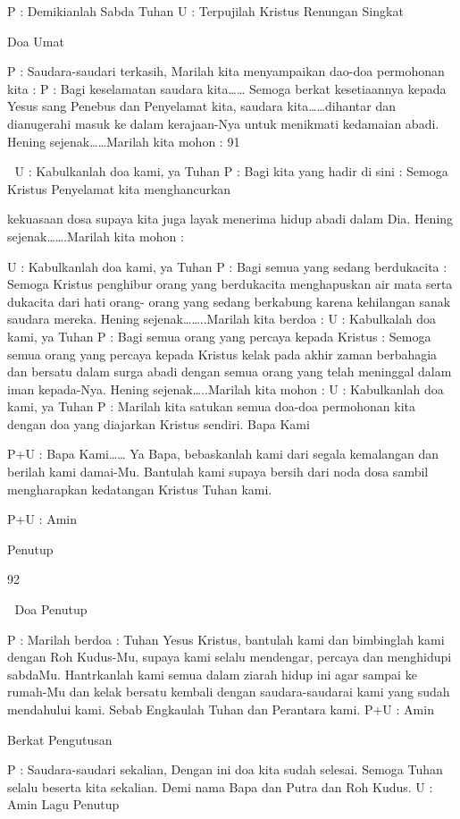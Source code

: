 \documentclass[10pt,a5paper,fancyhdr]{memoir}
\begin{document}
P : Demikianlah Sabda Tuhan 
U : Terpujilah Kristus 
Renungan Singkat 

Doa Umat 

P 
: Saudara-saudari terkasih, 
Marilah kita menyampaikan dao-doa permohonan kita : 
P 
: Bagi keselamatan saudara kita…… 
Semoga berkat kesetiaannya kepada Yesus sang Penebus 
dan Penyelamat kita, saudara kita……dihantar dan 
dianugerahi masuk ke dalam kerajaan-Nya untuk 
menikmati kedamaian abadi. 
Hening sejenak……Marilah kita mohon : 
91 



U : Kabulkanlah doa kami, ya Tuhan 
P : Bagi kita yang hadir di sini : 
Semoga Kristus Penyelamat kita menghancurkan 

kekuasaan dosa supaya kita juga layak menerima hidup 
abadi dalam Dia. 
Hening sejenak…….Marilah kita mohon 
: 


U : Kabulkanlah doa kami, ya Tuhan 
P 
: Bagi semua yang sedang berdukacita : 
Semoga Kristus penghibur orang yang berdukacita 
menghapuskan air mata serta dukacita dari hati orang-
orang yang sedang berkabung karena kehilangan sanak 
saudara mereka. 
Hening sejenak……..Marilah kita berdoa : 
U : Kabulkalah doa kami, ya Tuhan 
P 
: Bagi semua orang yang percaya kepada Kristus : 
Semoga semua orang yang percaya kepada Kristus kelak 
pada akhir zaman berbahagia dan bersatu dalam surga 
abadi dengan semua orang yang telah meninggal dalam 
iman kepada-Nya. 
Hening sejenak…..Marilah kita mohon : 
U : Kabulkanlah doa kami, ya Tuhan 
P 
: Marilah kita satukan semua doa-doa permohonan kita 
dengan doa yang diajarkan Kristus sendiri. 
Bapa Kami 

P+U : Bapa Kami…… 
Ya Bapa, bebaskanlah kami dari segala kemalangan dan 
berilah kami damai-Mu. Bantulah kami supaya bersih dari 
noda dosa sambil mengharapkan kedatangan Kristus 
Tuhan kami. 

P+U : Amin 

Penutup 

92 



Doa Penutup 

P 
: Marilah berdoa : 
Tuhan Yesus Kristus, bantulah kami dan bimbinglah kami 
dengan Roh Kudus-Mu, supaya kami selalu mendengar, 
percaya dan menghidupi sabdaMu. Hantrkanlah kami 
semua dalam ziarah hidup ini agar sampai ke rumah-Mu 
dan kelak bersatu kembali dengan saudara-saudarai kami 
yang sudah mendahului kami. Sebab Engkaulah Tuhan 
dan Perantara kami. 
P+U : Amin 

Berkat Pengutusan 

P 
: Saudara-saudari sekalian, 
Dengan ini doa kita sudah selesai. Semoga Tuhan selalu 
beserta kita sekalian. Demi nama Bapa dan Putra dan Roh 
Kudus. 
U : Amin 
Lagu Penutup 
\end{document}
